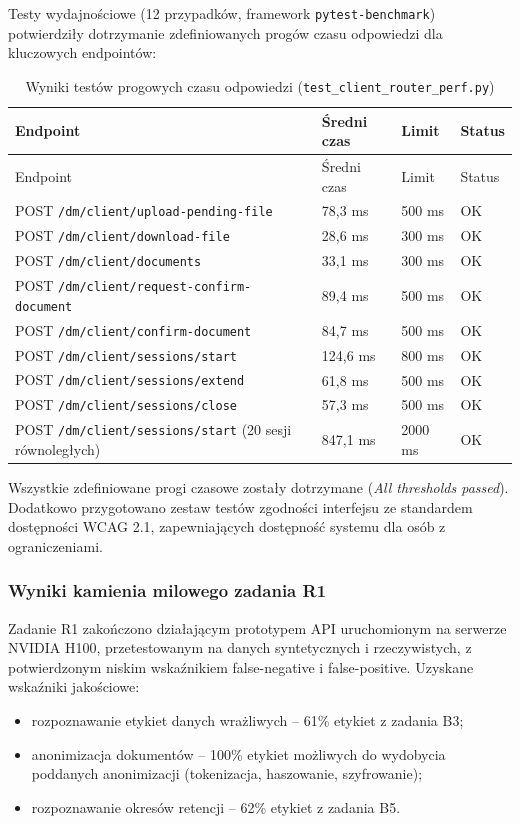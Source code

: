 Testy wydajnościowe (12 przypadków, framework \texttt{pytest-benchmark}) potwierdziły dotrzymanie zdefiniowanych progów czasu odpowiedzi dla kluczowych endpointów:

\begingroup
\small
\begin{longtable}{p{} p{} p{} p{}}
\caption{Wyniki testów progowych czasu odpowiedzi (\texttt{test\_client\_router\_perf.py})} \\
\toprule
\rowcolor{tablehead!15}
Endpoint & Średni czas & Limit & Status \\
\midrule
\endfirsthead
\toprule
\rowcolor{tablehead!15}
Endpoint & Średni czas & Limit & Status \\
\midrule
\endhead
POST \texttt{/dm/client/\allowbreak upload-pending-file} & 78,3 ms & 500 ms & OK \\
POST \texttt{/dm/client/\allowbreak download-file} & 28,6 ms & 300 ms & OK \\
POST \texttt{/dm/client/\allowbreak documents} & 33,1 ms & 300 ms & OK \\
POST \texttt{/dm/client/\allowbreak request-confirm-document} & 89,4 ms & 500 ms & OK \\
POST \texttt{/dm/client/\allowbreak confirm-document} & 84,7 ms & 500 ms & OK \\
POST \texttt{/dm/client/\allowbreak sessions/start} & 124,6 ms & 800 ms & OK \\
POST \texttt{/dm/client/\allowbreak sessions/extend} & 61,8 ms & 500 ms & OK \\
POST \texttt{/dm/client/\allowbreak sessions/close} & 57,3 ms & 500 ms & OK \\
POST \texttt{/dm/client/\allowbreak sessions/start} (20 sesji równoległych) & 847,1 ms & 2000 ms & OK \\
\bottomrule
\end{longtable}
\endgroup

Wszystkie zdefiniowane progi czasowe zostały dotrzymane (\emph{All thresholds passed}). Dodatkowo przygotowano zestaw testów zgodności interfejsu ze standardem dostępności WCAG 2.1, zapewniających dostępność systemu dla osób z ograniczeniami.

\subsubsection*{Wyniki kamienia milowego zadania R1}

Zadanie R1 zakończono działającym prototypem API uruchomionym na serwerze NVIDIA H100, przetestowanym na danych syntetycznych i rzeczywistych, z potwierdzonym niskim wskaźnikiem false-negative i false-positive. Uzyskane wskaźniki jakościowe:

\begin{itemize}
    \item rozpoznawanie etykiet danych wrażliwych -- 61\% etykiet z zadania B3;
    \item anonimizacja dokumentów -- 100\% etykiet możliwych do wydobycia poddanych anonimizacji (tokenizacja, haszowanie, szyfrowanie);
    \item rozpoznawanie okresów retencji -- 62\% etykiet z zadania B5.
\end{itemize}